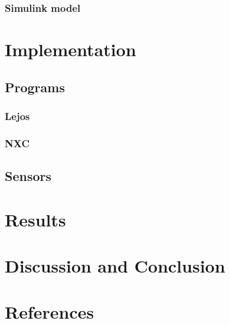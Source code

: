 \documentclass[a4paper]{article}
\begin{document}
        \subsubsection{Simulink model}
        
\section{Implementation}
	\subsection{Programs}
    	\subsubsection{Lejos}
    	\subsubsection{NXC}
    \subsection{Sensors}
    
\section{Results}

\section{Discussion and Conclusion}

\section{References}
\end{document}
